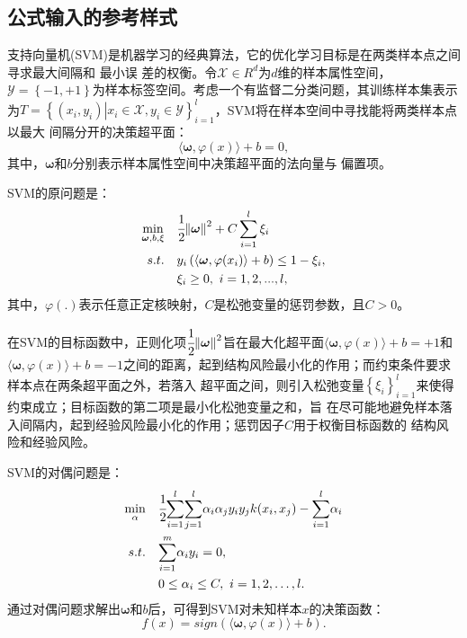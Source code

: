 \documentclass[twoside,zihao=-4,UTF8]{bjfu}
\begin{document}
\subsection{公式输入的参考样式}\label{sec:svm}
支持向量机(SVM)是机器学习的经典算法，它的优化学习目标是在两类样本点之间寻求最大间隔和
最小误
差的权衡。令$\mathscr{X} \in 
{{R}^{{{d}}}}$为$d$维的样本属性空间，$\mathscr{Y}=\left\{ 
-1,+1 
\right\}$为样本标签空间。考虑一个有监督二分类问题，其训练样本集表示为$T=\left\{
\left( x_{i},{{y}_{i}} \right)\left| x_{i}\in \mathscr{X},{{y}_{i}}\in 
\mathscr{Y} \right. \right\}_{i=1}^{l}$，SVM将在样本空间中寻找能将两类样本点以最大
间隔分开的决策超平面：
\begin{equation}
	\langle \boldsymbol{\omega}, \varphi (x) \rangle + b = 0 ,
\end{equation}
其中，${\boldsymbol{\omega}}$和$b$分别表示样本属性空间中决策超平面的法向量与
偏置项。

SVM的原问题是：
\begin{equation}
	\begin{aligned}
		\underset{\boldsymbol{\omega},b,\xi}{\mathop{\min }} & \quad 
		\cfrac{1}{2}{{\left\| \boldsymbol{\omega} 
		\right\|}^{2}} + C \sum\limits_{i=1}^{l}{{{\xi }_{i}}} \\ 
		s.t. & \quad {{y}_{i}}\left( \langle \boldsymbol{\omega}, \varphi 
		(x_{i}) 
		\rangle + b \right)\le 1-{{\xi }_{i}}, \\
		& \quad \xi_{i} \ge 0, \ i = 1,2,...,l,
	\end{aligned}
\end{equation}
其中，${{\varphi}(.)}$表示任意正定核映射，$C$是松弛变量的惩罚参数，且$C>0$。

在SVM的目标函数中，正则化项$\cfrac{1}{2}{{\left\| \boldsymbol{\omega} 
\right\|}^{2}}$旨在最大化超平面$\langle \boldsymbol{\omega}, \varphi (x) \rangle 
+ b = +1$和$\langle \boldsymbol{\omega}, \varphi (x) \rangle + b = 
-1$之间的距离，起到结构风险最小化的作用；而约束条件要求样本点在两条超平面之外，若落入
超平面之间，则引入松弛变量$\left\{ {{\xi }_{i}} 
\right\}_{i=1}^{l}$来使得约束成立；目标函数的第二项是最小化松弛变量之和，旨
在尽可能地避免样本落入间隔内，起到经验风险最小化的作用；惩罚因子$C$用于权衡目标函数的
结构风险和经验风险。

SVM的对偶问题是：
\begin{equation}
	\begin{aligned}
		\underset{\alpha}{\min} & \quad 
		\cfrac{1}{2}\underset{i=1}{\overset{l}{\mathop \sum }} 
		\underset{j=1}{\overset{l}{\mathop \sum }}{{\alpha }_{i}}{{\alpha}_{j}}{{y}_{i}}{{y}_{j}}k(x_{i},x_{j}) - 
		\underset{i=1}{\overset{l}{\mathop \sum }}{{\alpha }_{i}} \\
		s.t. & \quad \underset{i=1}{\overset{m}{\mathop \sum }}{{\alpha}_{i}}{{y}_{i}}=0,  \\
		& \quad 0 \le {{\alpha }_{i}}\le C, \ i=1,2,\ldots ,l.  \\
	\end{aligned} 
\end{equation}
通过对偶问题求解出$\boldsymbol{\omega}$和$b$后，可得到SVM对未知样本$x$的决策函数：
\begin{equation}
	f(x) = sign\left(\langle \boldsymbol{\omega}, \varphi(x) \rangle + b\right).
\end{equation}
\end{document}
